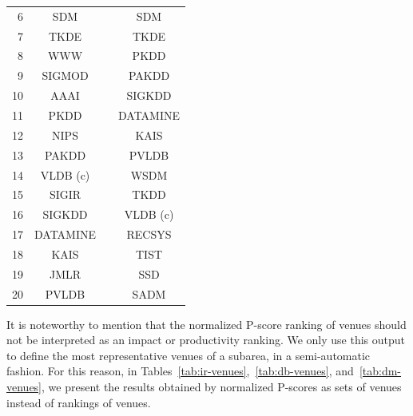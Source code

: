 \begin{table}[htbp]
\begin{tabular}{rccc}
6		&		SDM			& &		SDM			\\
7		&		TKDE		& &		TKDE		\\
8		&		WWW			& &		PKDD		\\
9		&		SIGMOD		& &		PAKDD		\\
10		&		AAAI		& &		SIGKDD		\\
11		&		PKDD		& &		DATAMINE	\\
12		&		NIPS		& &		KAIS		\\
13		&		PAKDD		& &		PVLDB		\\
14		&		VLDB (c)	& &		WSDM		\\
15		&		SIGIR		& &		TKDD		\\
16		&		SIGKDD		& &		VLDB (c)	\\
17		&		DATAMINE	& &		RECSYS		\\
18		&		KAIS		& &		TIST		\\
19		&		JMLR		& &		SSD			\\
20		&		PVLDB		& &		SADM		\\
\bottomrule
\end{tabular}
\end{table}

It is noteworthy to mention that the normalized P-score ranking of venues should not be interpreted as an impact or productivity ranking. We only use this output to define the most representative venues of a subarea, in a semi-automatic fashion. {\color{blue} For this reason, in Tables~\ref{tab:ir-venues},~\ref{tab:db-venues}, and~\ref{tab:dm-venues}, we present the results obtained by normalized P-scores as sets of venues instead of rankings of venues.}













